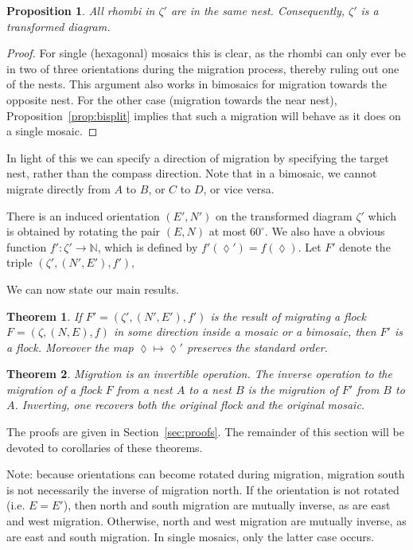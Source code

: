 \documentclass[12pt]{article}
\newcommand{\NN}{\mathbb{N}}
\newtheorem{theorem}{Theorem}
\newtheorem{proposition}[lemma]{Proposition}
\begin{document}
\begin{proposition}
\label{prop:samenest}
All rhombi in $\zeta'$ are in the same nest.
Consequently, $\zeta'$ is a transformed diagram.
\end{proposition}

\begin{proof}
For single (hexagonal) mosaics this is clear, as the rhombi can only ever 
be in 
two of three orientations during the migration process, thereby ruling
out one of the nests.  This argument also works in 
bimosaics for migration towards the opposite nest.  For the other
case (migration towards the near nest), 
Proposition~\ref{prop:bisplit} implies that such a migration 
will behave as it does on a single mosaic.
\end{proof}

In light of this we can specify a direction of migration by specifying
the target nest, rather than the compass direction.  Note that in
a bimosaic, we cannot migrate directly from $A$ to $B$, or 
$C$ to $D$, or vice versa.

There is an induced orientation $(E',N')$ on the transformed
diagram $\zeta'$
which is obtained by rotating the pair $(E,N)$ at most $60^\circ$.
We also have a obvious function $f':\zeta' \to \NN$, which
is defined by $f'(\lozenge') = f(\lozenge)$.  Let $F'$ denote the triple
$(\zeta', (N',E'), f')$,

We can now state our main results.  
\begin{theorem}
\label{thm:isflock}
If $F'=(\zeta', (N',E'), f')$ is the result of migrating a flock 
$F = (\zeta, (N,E), f)$ in some direction inside a mosaic or
a bimosaic, then $F'$ is a flock.  Moreover the map
$\lozenge \mapsto \lozenge'$ preserves the standard order.
\end{theorem}

\begin{theorem}
\label{thm:invertible}
Migration is an invertible operation. 
The inverse operation to
the migration of a flock $F$ from
a nest $A$ to a nest $B$ is the migration of $F'$ from $B$ to $A$.
Inverting, one recovers both the original flock and the 
original mosaic.
\end{theorem}

The proofs are given 
in Section~\ref{sec:proofs}.  The remainder of this section will
be devoted to corollaries of these theorems.


Note: because orientations can become rotated during migration,
migration south is not necessarily the inverse of migration north.
If the orientation is
not rotated (i.e. $E = E'$), then north and south migration are mutually 
inverse, as are east and west migration.
Otherwise, north and west migration are mutually inverse,
as are east and south migration.  In single mosaics, only the latter
case occurs.
\end{document}
